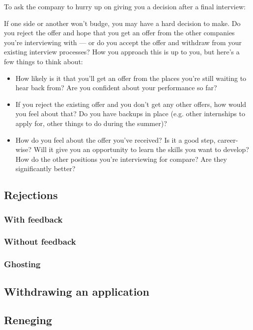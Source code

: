 To ask the company to hurry up on giving you a decision after a final interview: 


If one side or another won't budge, you may have a hard decision to make. Do you reject the offer and hope that you get an offer from the other companies you're interviewing with --- or do you accept the offer and withdraw from your existing interview processes? How you approach this is up to you, but here's a few things to think about:
\begin{itemize}
\item How likely is it that you'll get an offer from the places you're still waiting to hear back from? Are you confident about your performance so far?
\item If you reject the existing offer and you don't get any other offers, how would you feel about that? Do you have backups in place (e.g. other internships to apply for, other things to do during the summer)?
\item How do you feel about the offer you've received? Is it a good step, career-wise? Will it give you an opportunity to learn the skills you want to develop? How do the other positions you're interviewing for compare? Are they significantly better?
\end{itemize}

\subsection{Rejections}
\subsubsection{With feedback}
\subsubsection{Without feedback} 
\subsubsection{Ghosting}

\subsection{Withdrawing an application}

\subsection{Reneging} 